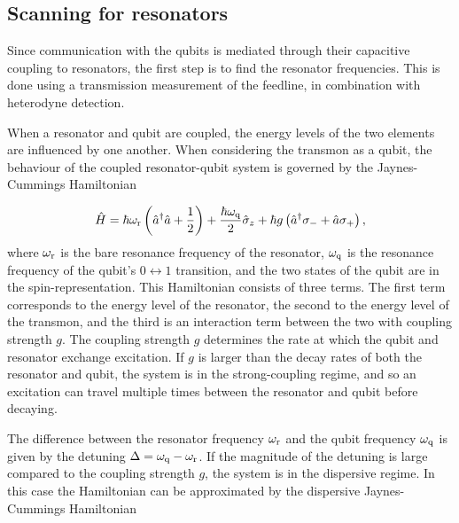       \subsection{Scanning for resonators}
        \label{sec:resonator-scan}
        Since communication with the qubits is mediated through their capacitive coupling to resonators, the first step is to find the resonator frequencies. This is done using a transmission measurement of the feedline, in combination with heterodyne detection.

        When a resonator and qubit are coupled, the energy levels of the two elements are influenced by one another. When considering the transmon as a qubit, the behaviour of the coupled resonator-qubit system is governed by the Jaynes-Cummings Hamiltonian \cite{koch2007Transmon}

        \begin{equation}
          \hat{H} = \hbar \omega_\text{r}\left(\hat{a}^\dagger \hat{a} + \frac{1}{2} \right) + \frac{\hbar \omega_\text{q}}{2}\hat{\sigma}_z + \hbar g \left(\hat{a}^\dagger \sigma_{-} + \hat{a}\sigma_{+}\right),
          \label{eq:Jaynes-Cummings}
        \end{equation}
        where $\omega_\text{r}$ is the bare resonance frequency of the resonator, $\omega_\text{q}$ is the resonance frequency of the qubit's $0\leftrightarrow 1$ transition, and the two states of the qubit are in the spin-representation. This Hamiltonian consists of three terms. The first term corresponds to the energy level of the resonator, the second to the energy level of the transmon, and the third is an interaction term between the two with coupling strength $g$. The coupling strength $g$ determines the rate at which the qubit and resonator exchange excitation. If $g$ is larger than the decay rates of both the resonator and qubit, the system is in the strong-coupling regime, and so an excitation can travel multiple times between the resonator and qubit before decaying.

        The difference between the resonator frequency $\omega_\text{r}$ and the qubit frequency $\omega_\text{q}$ is given by the detuning $\Delta = \omega_\text{q} - \omega_\text{r}$. If the magnitude of the detuning is large compared to the coupling strength $g$, the system is in the dispersive regime. In this case the Hamiltonian can be approximated by the dispersive Jaynes-Cummings Hamiltonian

